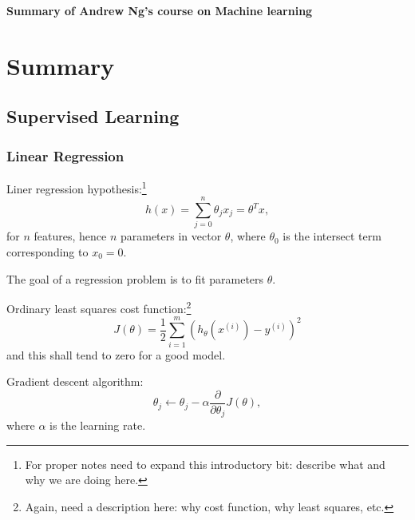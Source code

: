 \documentclass[a4paper,11pt]{article}
\begin{document}
\textbf{\Large{Summary of Andrew Ng's course on Machine learning}}

\tableofcontents

\newpage

\section{Summary}
\subsection{Supervised Learning}
\subsubsection{Linear Regression}
Liner regression hypothesis:\footnote{For proper notes need to expand this introductory bit: describe what and why we are doing here.}
\begin{equation}
h(x) = \sum_{j = 0} ^n \theta_j x_j = \theta^T x ,
\end{equation}
for \textcolor{OliveGreen}{$n$} features, hence \textcolor{OliveGreen}{$n$} parameters in vector \textcolor{OliveGreen}{$\theta$}, where \textcolor{OliveGreen}{$\theta_0$} is the intersect term corresponding to \textcolor{OliveGreen}{$x_0 = 0$}.

The goal of a regression problem is to fit parameters \textcolor{OliveGreen}{$\theta$}.

Ordinary least squares cost function:\footnote{Again, need a description here: why cost function, why least squares, etc.}
\begin{equation}
J \left( \theta \right) = \frac{1}{2} \sum_{i=1} ^m \left( h_\theta (x^{(i)}) - y^{(i)} \right)^2
\end{equation}
and this shall tend to zero for a good model.

\noindent{}

Gradient descent algorithm:
\begin{equation}
\theta_j \leftarrow \theta_j - \alpha \frac{\partial}{\partial \theta_j} J \left( \theta \right) ,
\end{equation}
where \textcolor{OliveGreen}{$\alpha$} is the learning rate.
\end{document}
